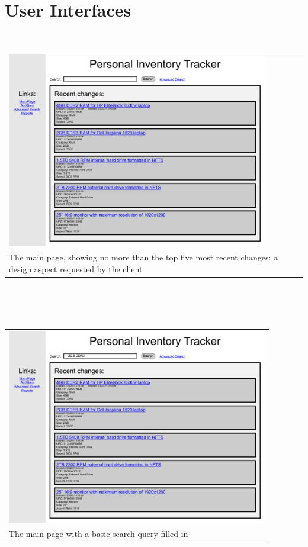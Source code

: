 \documentclass{article}
\begin{document}
\section{User Interfaces}
\graphicspath{{../StoryboardImages/}}
~\\
\begin{tabular}{ p{4.5in} }
\includegraphics[keepaspectratio, width=4.5in]{addItemF0S0.pdf}\\
The main page, showing no more than the top five most recent changes: a design aspect requested by the client
\end{tabular}\\
~\\
~\\
\begin{tabular}{ p{4.5in} }
\includegraphics[keepaspectratio, width=4.5in]{basicSearchF0S0.pdf} \\
The main page with a basic search query filled in
\end{tabular}\\
\end{document}
